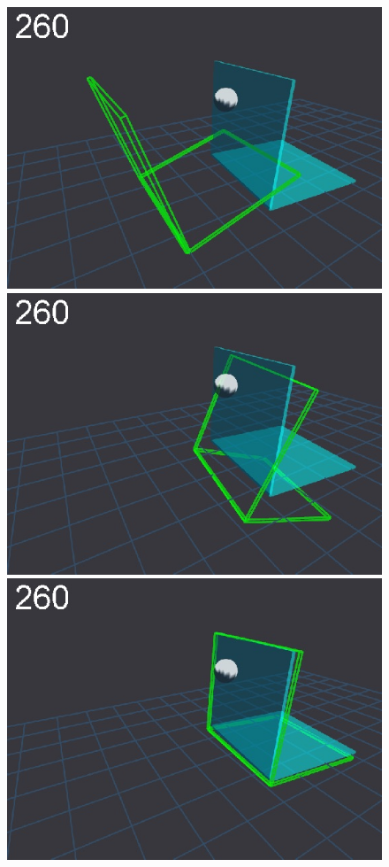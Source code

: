 \begin{figure}[tb]
\centerline{
\includegraphics[width=\imgBXwid]{./B1_1exp_20_4}
\includegraphics[width=\imgBXwid]{./B1_2exp_20_4}
\includegraphics[width=\imgBXwid]{./B1_3exp_20_4}
}
\end{figure}
